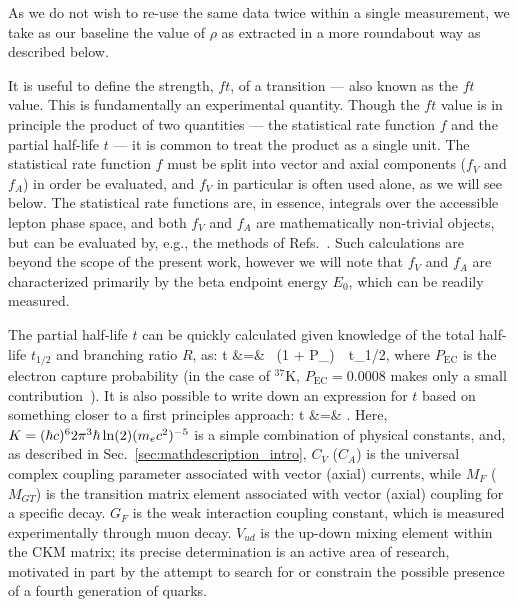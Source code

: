 As we do not wish to re-use the same data twice within a single measurement, we take as our baseline the value of $\rho$ as extracted in a more roundabout way as described below.


It is useful to define the strength, $ft$, of a transition --- also known as the $ft$ value.  This is fundamentally an experimental quantity.  Though the $ft$ value is in principle the product of two quantities --- the statistical rate function $f$ and the partial half-life $t$ --- it is common to treat the product as a single unit.  
%
The statistical rate function $f$ must be split into vector and axial components ($f_V$ and $f_A$) in order be evaluated, and $f_V$ in particular is often used alone, as we will see below.  The statistical rate functions are, in essence, integrals over the accessible lepton phase space, and both $f_V$ and $f_A$ are mathematically non-trivial objects\cite{towner_hardy_1995_frombook}\cite{HardyTowner2005_Superallowed}, but can be evaluated by, e.g., the methods of Refs.~\cite{wilkinson2}\cite{wilkinson3}\cite{wilkinson4}.  
Such calculations are beyond the scope of the present work, however we will note that 
$f_V$ and $f_A$ are characterized primarily by the beta endpoint energy $E_0$, which can be readily measured.  

The partial half-life $t$ can be quickly calculated given knowledge of the total half-life $t_{1/2}$ and branching ratio $R$, as:
\bea
t &=&   \, (1 + P_{}) \,\, t_{1/2}, 
\eea
where $P_{\mathrm{EC}}$ is the electron capture probability (in the case of $^{37}$K, $P_{\mathrm{EC}}=0.0008$ makes only a small contribution~\cite{SeverijnsTandecki2008}).  
It is also possible to write down an expression for $t$ based on something closer to a first principles approach:  
\bea
t &=& .
\label{eq:partialhalflife_theory}
\eea
Here, $K = (\hbar c)^6 2\pi^3 \hbar \ln(2) (m_e c^2)^{-5}$ is a simple combination of physical constants, and, as described in Sec.~\ref{sec:mathdescription_intro}, $C_V$ ($C_A$) is the universal complex coupling parameter associated with vector (axial) currents, while $M_F$ ($M_{GT}$) is the transition matrix element associated with vector (axial) coupling for a specific decay.
$G_F$ is the weak interaction coupling constant, which is measured experimentally through muon decay.  $V_{ud}$ is the up-down mixing element within the \ac{CKM} matrix; its precise determination is an active area of research, motivated in part by the attempt to search for or constrain the possible presence of a fourth generation of quarks.  

